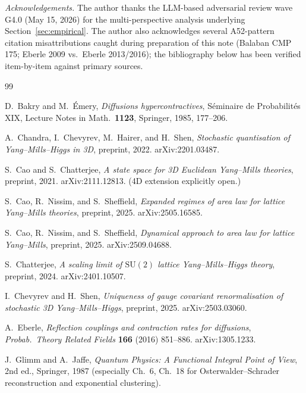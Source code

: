 \documentclass[11pt,a4paper]{amsart}
\theoremstyle{definition}
\theoremstyle{remark}
\begin{document}
\bigskip

\textit{Acknowledgements.} The author thanks the LLM-based adversarial review wave G4.0 (May 15, 2026) for the multi-perspective analysis underlying Section~\ref{sec:empirical}. The author also acknowledges several A52-pattern citation misattributions caught during preparation of this note (Balaban CMP 175; Eberle 2009 vs.\ Eberle 2013/2016); the bibliography below has been verified item-by-item against primary sources.

\begin{thebibliography}{99}

D.~Bakry and M.~\'Emery,
\textit{Diffusions hypercontractives},
S\'eminaire de Probabilit\'es XIX, Lecture Notes in Math.\ \textbf{1123}, Springer, 1985, 177--206.

A.~Chandra, I.~Chevyrev, M.~Hairer, and H.~Shen,
\textit{Stochastic quantisation of Yang--Mills--Higgs in 3D},
preprint, 2022. arXiv:2201.03487.

S.~Cao and S.~Chatterjee,
\textit{A state space for 3D Euclidean Yang--Mills theories},
preprint, 2021. arXiv:2111.12813. (4D extension explicitly open.)

S.~Cao, R.~Nissim, and S.~Sheffield,
\textit{Expanded regimes of area law for lattice Yang--Mills theories},
preprint, 2025. arXiv:2505.16585.

S.~Cao, R.~Nissim, and S.~Sheffield,
\textit{Dynamical approach to area law for lattice Yang--Mills},
preprint, 2025. arXiv:2509.04688.

S.~Chatterjee,
\textit{A scaling limit of $\mathrm{SU}(2)$ lattice Yang--Mills--Higgs theory},
preprint, 2024. arXiv:2401.10507.

I.~Chevyrev and H.~Shen,
\textit{Uniqueness of gauge covariant renormalisation of stochastic 3D Yang--Mills--Higgs},
preprint, 2025. arXiv:2503.03060.

A.~Eberle,
\textit{Reflection couplings and contraction rates for diffusions},
\textit{Probab.\ Theory Related Fields} \textbf{166} (2016) 851--886. arXiv:1305.1233.

J.~Glimm and A.~Jaffe,
\textit{Quantum Physics: A Functional Integral Point of View},
2nd ed., Springer, 1987 (especially Ch.\ 6, Ch.\ 18 for Osterwalder--Schrader reconstruction and exponential clustering).


\end{thebibliography}
\end{document}
